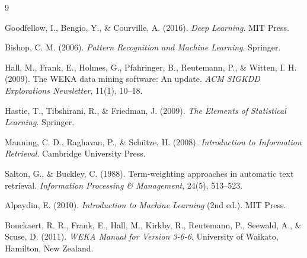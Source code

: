 \documentclass[12pt, a4paper]{article}
\begin{document}
\newpage

\begin{thebibliography}{9}

Goodfellow, I., Bengio, Y., \& Courville, A. (2016).
\textit{Deep Learning}. MIT Press.

Bishop, C. M. (2006).
\textit{Pattern Recognition and Machine Learning}. Springer.

Hall, M., Frank, E., Holmes, G., Pfahringer, B., Reutemann, P., \& Witten, I. H. (2009).
The WEKA data mining software: An update.
\textit{ACM SIGKDD Explorations Newsletter}, 11(1), 10--18.

Hastie, T., Tibshirani, R., \& Friedman, J. (2009).
\textit{The Elements of Statistical Learning}. Springer.

Manning, C. D., Raghavan, P., \& Sch\"utze, H. (2008).
\textit{Introduction to Information Retrieval}. Cambridge University Press.

Salton, G., \& Buckley, C. (1988).
Term-weighting approaches in automatic text retrieval.
\textit{Information Processing \& Management}, 24(5), 513--523.

Alpaydin, E. (2010).
\textit{Introduction to Machine Learning} (2nd ed.). MIT Press.

Bouckaert, R. R., Frank, E., Hall, M., Kirkby, R., Reutemann, P., Seewald, A., \& Scuse, D. (2011).
\textit{WEKA Manual for Version 3-6-6}. University of Waikato, Hamilton, New Zealand.

\end{thebibliography}
\end{document}
